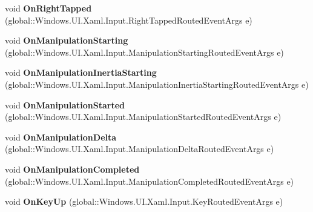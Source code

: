 \begin{DoxyCompactItemize}
void {\bfseries On\+Right\+Tapped} (global\+::\+Windows.\+U\+I.\+Xaml.\+Input.\+Right\+Tapped\+Routed\+Event\+Args e)
\item 
\mbox{\label{interface_windows_1_1_u_i_1_1_xaml_1_1_controls_1_1_i_control_overrides_aa77c2f27ff19f19ddb9d11c56eb88ecf}} 
void {\bfseries On\+Manipulation\+Starting} (global\+::\+Windows.\+U\+I.\+Xaml.\+Input.\+Manipulation\+Starting\+Routed\+Event\+Args e)
\item 
\mbox{\label{interface_windows_1_1_u_i_1_1_xaml_1_1_controls_1_1_i_control_overrides_a21b1d1b2b1ecdec91300370cf68756eb}} 
void {\bfseries On\+Manipulation\+Inertia\+Starting} (global\+::\+Windows.\+U\+I.\+Xaml.\+Input.\+Manipulation\+Inertia\+Starting\+Routed\+Event\+Args e)
\item 
\mbox{\label{interface_windows_1_1_u_i_1_1_xaml_1_1_controls_1_1_i_control_overrides_ac3442eba714609f27fe4dd677f6f69cf}} 
void {\bfseries On\+Manipulation\+Started} (global\+::\+Windows.\+U\+I.\+Xaml.\+Input.\+Manipulation\+Started\+Routed\+Event\+Args e)
\item 
\mbox{\label{interface_windows_1_1_u_i_1_1_xaml_1_1_controls_1_1_i_control_overrides_a34e586f6a14135e204c81f1e9f6b5e18}} 
void {\bfseries On\+Manipulation\+Delta} (global\+::\+Windows.\+U\+I.\+Xaml.\+Input.\+Manipulation\+Delta\+Routed\+Event\+Args e)
\item 
\mbox{\label{interface_windows_1_1_u_i_1_1_xaml_1_1_controls_1_1_i_control_overrides_ab30d6aba08b80481dbb976080452f0f8}} 
void {\bfseries On\+Manipulation\+Completed} (global\+::\+Windows.\+U\+I.\+Xaml.\+Input.\+Manipulation\+Completed\+Routed\+Event\+Args e)
\item 
\mbox{\label{interface_windows_1_1_u_i_1_1_xaml_1_1_controls_1_1_i_control_overrides_ac591ce0737bcc8e2cf2c6b8bd5621e9d}} 
void {\bfseries On\+Key\+Up} (global\+::\+Windows.\+U\+I.\+Xaml.\+Input.\+Key\+Routed\+Event\+Args e)

\end{DoxyCompactItemize}
